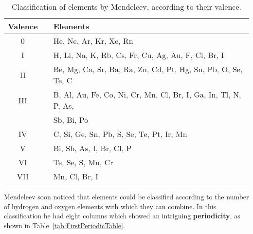 \begin{center}
\begin{table}
\begin{tabular}{c cl}
 Valence && Elements \\\hline
 0 && He, Ne, Ar, Kr, Xe, Rn \\
 I &&  H, Li, Na, K, Rb, Cs, Fr, Cu, Ag, Au, F, Cl, Br, I \\
 II && Be, Mg, Ca, Sr, Ba, Ra, Zn, Cd, Pt, Hg, Sn, Pb, O, Se, Te, C \\
 III && B, Al, Au, Fe, Co, Ni, Cr, Mn, Cl, Br, I, Ga, In, Tl, N, P, As, \\ 
 && Sb, Bi, Po \\
 IV && C, Si, Ge, Sn, Pb, S, Se, Te, Pt, Ir, Mn \\
 V && Bi, Sb, As, I, Br, Cl, P \\
 VI && Te, Se, S, Mn, Cr \\
 VII && Mn, Cl, Br, I \\
\end{tabular}
\caption{Classification of elements by Mendeleev, according to their valence.}\label{tab:mendeleev}
\end{table}
\end{center}

Mendeleev soon noticed that elements could be classified according to the number of hydrogen and oxygen elements with which they can combine. In this classification he had eight columns which showed an intriguing {\bf periodicity}, as shown in Table~\ref{tab:FirstPeriodicTable}.

